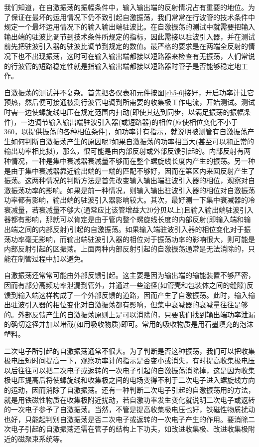 我们知道，在自激振荡的振幅条件中，输入输出端的反射情况占有重要的地位。为了保证在最坏的运用情况下仍不致引起自激振荡，我们常常在行波管的技术条件中规定一个最坏运用情况下的输入输出端驻波比。在自激振荡的测试中就需要把输入输出端的驻波比调节到技术条件所规定的指标，因此需接以驻波引入器，并在测试前先把驻波引入器的驻波比调节到规定的数值。最严格的要求是在两端全反射的情况下也不出现振荡，这时可在输入输出端都接以短路器来检查有无振荡，人们常说的行波管的短路稳定性就是指输入输出端都接以短路器时管子是否能够稳定地工作。


自激振荡的测试并不复杂。首先把各仪表和元件按图\ref{ch5-6}接好，开启功率计让它预热，然后便可接通被测行波管电调到所需要的收集极工作电流，开始测试。测试时需一边使螺旋线电压在规定范围内扫动(即使其达到同步，以满足振荡的振幅条件)，一边调节输入输出端驻波引入器(或短路器)的相位(应使相位变化不小于360\textdegree，以提供振荡的各种相位条件)，如功率计有指示，就说明被测管有自激振荡产生如何判断自激振荡产生的原因呢?如果自激振荡的功率相当大(甚至可以和正常的输出功率相比拟)，那么，很可能是由内部反射或外部反馈引起的。内部反射有两种情况，一种是集中衰减器衰减量不够而在整个螺旋线长度内产生的振荡。另一种是由于集中衰减器靠近输出端的一端的匹配不够好，因而在第区内来回反射产生了振荡。这两种情况的判断方法是首先改变输入输出端驻波引入器的相位，观察对自激振荡功率的影响。如果是前一种情况，则输入输出驻波引入器的相位对自激振荡功率都有影响，输出端的驻波引入器影响较大。其次，最好测一下集中衰减器的冷衰减量，若衰减量不够大(通常应比该管增益大20分贝以上)且输入输出端驻波引入器都有影响，那就可以肯定是由于管内整个螺旋线长度的内部反射(即输入端和输出端之间的内部反射)引起的自激振荡。如果输入端驻波引入器的相位变化对于振荡功率毫无影响，而输出端驻波引入器的相位对于振荡功率的影响很大，则可能是内部反射引起的\uppercase\expandafter{}区振荡。上面两种内部反射引起的自激振荡通常是无法消除的，只能在制管过程中加以避免。


自激振荡还常常可能由外部反馈引起。这主要是因为输出端的输能装置不够严密，因而有部分高频功率泄漏到管外，并通过一些途径(如管壳和包装体之间的缝隙)反馈到输入端这样构成了一个外部反馈的道路，因而产生了自激振荡。此时，输入输出驻波引入器的相位变化对自激振荡都有影响，但集中衰减器的衰减量往往是够的。外部反馈产生的自激振荡原则上是可以消除的，只要我们找到输出端功率泄漏的确切途径并加以堵截(如用吸收物质)即可。常用的吸收物质是用石墨填充的泡沫塑料。


二次电子所引起的自激振荡通常不很大。为了判断是否这种振荡，我们可以把收集极电压短时间提高一下，观察功率计的指示是否变小或消失，有时提高收集极电压以后往往可以把二次电子或返转的一次电子引起的自激振荡消除掉，这是因为收集极电压提高后将使螺旋线和收集极之间的电场变得不利于二次电子进入螺旋线方向的运动，因而消除了自激振荡。还有一种判断二次电子引起的自激振荡用的方法，就是用铁磁性物质在收集极附近扰动，若自激功率发生变化就说明二次电子或返转的一次电子参予了自激振荡。当然，不管是提高收集极电压也好，铁磁性物质扰动也好，只能起判别自激振荡是否二次电子或返转的一次电子产生的作用。要消除二次电子引起的自激振荡还需在管子的结构上下功夫，如改进收集极、改进收集极附近的磁聚束系统等。


